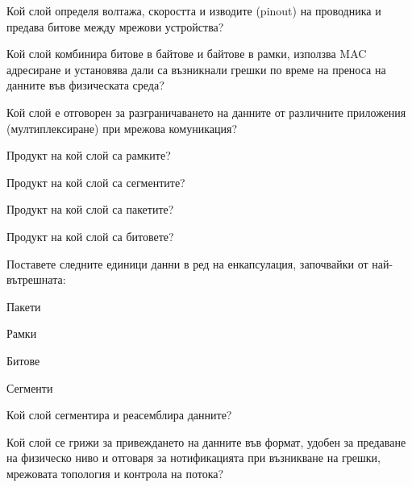 \begin{q}
  Кой слой определя волтажа, скоростта и изводите (pinout) на проводника и
  предава битове между мрежови устройства?
\end{q}

\begin{q}
  Кой слой комбинира битове в байтове и байтове в рамки, използва MAC адресиране
  и установява дали са възникнали грешки по време на преноса на данните във
  физическата среда?
\end{q}

\begin{q}
  Кой слой е отговорен за разграничаването на данните от различните приложения
  (мултиплексиране) при мрежова комуникация?
\end{q}

\begin{q}
  Продукт на кой слой са рамките?
\end{q}

\begin{q}
  Продукт на кой слой са сегментите?
\end{q}

\begin{q}
  Продукт на кой слой са пакетите?
\end{q}

\begin{q}
  Продукт на кой слой са битовете?
\end{q}

\begin{q}
  Поставете следните единици данни в ред на енкапсулация, започвайки от
  най-вътрешната:

  \begin{itemize*}
  \item Пакети
  \item Рамки
  \item Битове
  \item Сегменти
  \end{itemize*}
\end{q}

\begin{q}
  Кой слой сегментира и реасемблира данните?
\end{q}

\begin{q}
  Кой слой се грижи за привеждането на данните във формат, удобен за предаване
  на физическо ниво и отговаря за нотификацията при възникване на грешки,
  мрежовата топология и контрола на потока?
\end{q}

